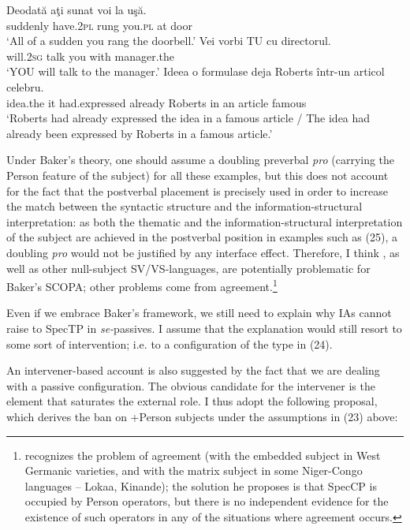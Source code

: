 \documentclass[output=paper]{langsci/langscibook}
\begin{document}
\ea%
    \label{ex:giurgea:25}
    \ea
    \gll Deodată   aţi           sunat   voi     la  uşă.  \\
          suddenly have.\textsc{2pl}  rung   you.\textsc{pl}   at door\\
    \glt ‘All of a sudden you rang the doorbell.’
    \ex
    \gll Vei        vorbi TU  cu    directorul.         \\
         will.\textsc{2sg} talk    you with manager.the\\
    \glt ‘YOU will talk to the manager.’
    \ex
    \gll Ideea    o formulase         deja      Roberts într-un articol celebru. \\
         idea.the it had.expressed already Roberts  {in  an} article  famous    \\
    \glt ‘Roberts had already expressed the idea in a famous article / The idea had already been expressed by Roberts in a famous article.’
    \z
\z       

Under Baker’s theory, one should assume a doubling preverbal \textit{pro} (carrying the Person feature of the subject) for all these examples, but this does not account for the fact that the postverbal placement is precisely used in order to increase the match between the syntactic structure and the information-structural interpretation: as both the thematic and the information-structural interpretation of the subject are achieved in the postverbal position in examples such as (25), a doubling \textit{pro} would not be justified by any interface effect. Therefore, I think , as well as other null-subject SV\slash VS-languages, are potentially problematic for Baker’s SCOPA; other problems come from  agreement.\footnote{\citet{Baker2008} recognizes the problem of  agreement (with the embedded subject in West Germanic varieties, and with the matrix subject in some Niger-Congo languages – Lokaa, Kinande); the solution he proposes is that SpecCP is occupied by Person operators, but there is no independent evidence for the existence of such operators in any of the situations where  agreement occurs.}

  Even if we embrace Baker’s framework, we still need to explain why IAs cannot raise to SpecTP in \textit{se-}passives. I assume that the explanation would still resort to some sort of intervention; i.e. to a configuration of the type in (24). 

  An intervener-based account is also suggested by the fact that we are dealing with a passive configuration. The obvious candidate for the intervener is the element that saturates the external role. I thus adopt the following proposal, which derives the ban on +Person subjects under the assumptions in (23) above:
\end{document}
